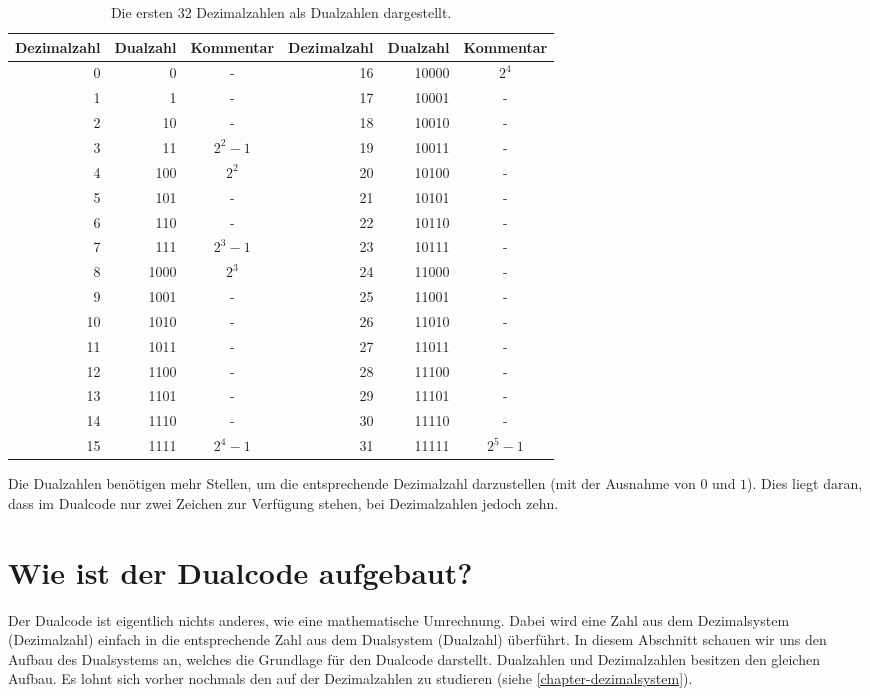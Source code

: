 \begin{table}[htb]
\centering
\begin{tabular}{rrc||rrc}
\toprule
\small{\textbf{Dezimalzahl}} &  \small{\textbf{Dualzahl}} & \small{\textbf{Kommentar}} &  \small{\textbf{Dezimalzahl}} &  \small{\textbf{Dualzahl}} &  \small{\textbf{Kommentar}} \\
\midrule
0 & 0 & - & 16 & 10000 & $2^4$ \\
1 & 1 & - & 17 & 10001 & - \\
2 & 10 & - & 18 & 10010 & - \\
3 & 11 & $2^2-1$ & 19 & 10011 & - \\
4 & 100 & $2^2$ & 20 & 10100 & - \\
5 & 101 & - & 21 & 10101 & - \\
6 & 110 & - & 22 & 10110 & - \\
7 & 111 & $2^3-1$ & 23 & 10111 & - \\
8 & 1000 & $2^3$ & 24 & 11000 & - \\
9 & 1001 & - & 25 & 11001 & - \\
10 & 1010 & - & 26 & 11010 & - \\
11 & 1011 & - & 27 & 11011 & - \\
12 & 1100 & - & 28 & 11100 & - \\
13 & 1101 & - & 29 & 11101 & - \\
14 & 1110 & - & 30 & 11110 & - \\
15 & 1111 & $2^4-1$ & 31 & 11111 & $2^5-1$ \\
\bottomrule
\end{tabular}
\caption{Die ersten $32$ Dezimalzahlen als Dualzahlen dargestellt.}
\label{table-counting-numbers}
\end{table}

Die Dualzahlen benötigen mehr Stellen, um die entsprechende Dezimalzahl darzustellen (mit der Ausnahme von $0$ und $1$). Dies liegt daran, dass im Dualcode nur zwei Zeichen zur Verfügung stehen, bei Dezimalzahlen jedoch zehn.

\section{Wie ist der Dualcode aufgebaut?}

Der Dualcode ist eigentlich nichts anderes, wie eine mathematische Umrechnung. Dabei wird eine Zahl aus dem Dezimalsystem (Dezimalzahl) einfach in die entsprechende Zahl aus dem Dualsystem (Dualzahl) überführt. In diesem Abschnitt schauen wir uns den Aufbau des Dualsystems an, welches die Grundlage für den Dualcode darstellt. Dualzahlen und Dezimalzahlen besitzen den gleichen Aufbau. Es lohnt sich vorher nochmals den auf der Dezimalzahlen zu studieren (siehe \autoref{chapter-dezimalsystem}).

